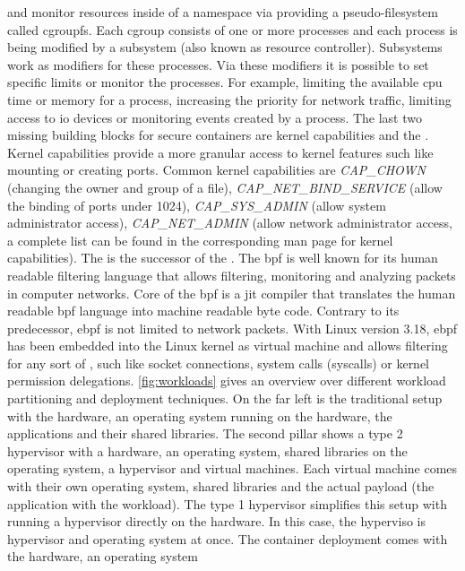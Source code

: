 \documentclass[titlepage]{report}
\begin{document}
and monitor resources inside of a namespace via providing a pseudo-filesystem called cgroupfs\cite{mancgroups}. Each \gls{cgroup} consists
of one or more processes and each process is being modified by a subsystem (also known as resource controller). Subsystems work as modifiers
for these processes. Via these modifiers it is possible to set specific limits or monitor the processes. For example, limiting the available
\gls{cpu} time or memory for a process, increasing the priority for network traffic, limiting access to \gls{io} devices or
monitoring events created by a process\cite{mancgroups}. The last two missing building blocks for secure containers are kernel capabilities and the .
Kernel capabilities provide a more granular access to kernel features such like mounting or creating ports\cite{dockersecurity}.
Common kernel capabilities are \emph{CAP\_CHOWN} (changing the owner and group of a file), \emph{CAP\_NET\_BIND\_SERVICE} (allow the binding of ports under 1024), 
\emph{CAP\_SYS\_ADMIN} (allow system administrator access), \emph{CAP\_NET\_ADMIN} (allow network administrator access, a complete list can be found
in the corresponding man page for kernel capabilities\cite{mancapabilities}). The  is the successor of the . The \gls{bpf} is 
well known for its human readable filtering language that allows filtering, monitoring and analyzing packets in computer networks. Core of the \gls{bpf}
is a \gls{jit} compiler that translates the human readable \gls{bpf} language into machine readable byte code. Contrary to its predecessor, \gls{ebpf} is not limited
to network packets. With Linux version 3.18, \gls{ebpf} has been embedded into the Linux kernel as virtual machine and allows filtering for any sort of ,
such like socket connections, system calls (syscalls) or kernel permission delegations. \autoref{fig:workloads} gives an overview over different workload partitioning and
deployment techniques. On the far left is the traditional setup with the hardware, an operating system running on the hardware, the applications and their shared libraries.
The second pillar shows a type 2 hypervisor with a hardware, an operating system, shared libraries on the operating system, a hypervisor and virtual machines. Each virtual machine
comes with their own operating system, shared libraries and the actual payload (the application with the workload). The type 1 hypervisor simplifies this setup with running
a hypervisor directly on the hardware. In this case, the hyperviso is hypervisor and operating system at once. The container deployment comes with the hardware, an operating system 
\end{document}
